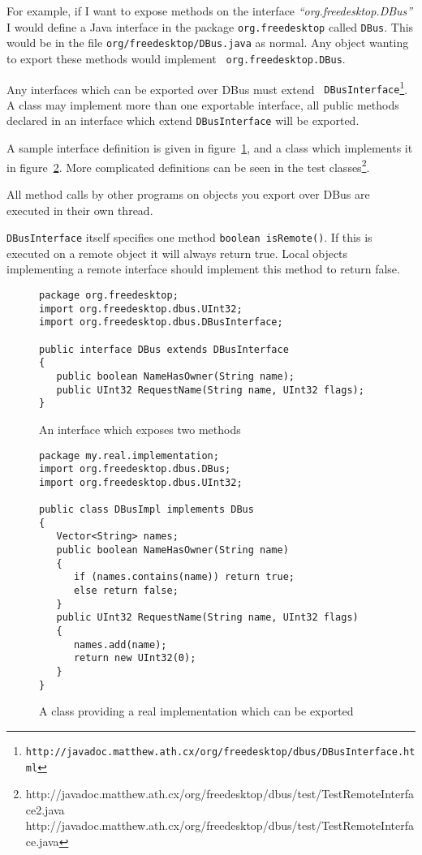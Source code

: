 \documentclass[a4paper,12pt]{article}
\begin{document}
For example, if I want to expose methods on the interface
{\em ``org.freedesktop.DBus''} I would define a Java interface in
the package {\tt org.freedesktop} called {\tt DBus}. This would be
in the file {\tt org/freedesktop/DBus.java} as normal. Any object
wanting to export these methods would implement {\tt
org.freedesktop.DBus}.

Any interfaces which can be exported over DBus must extend {\tt
DBusInterface\footnote{http://javadoc.matthew.ath.cx/org/freedesktop/dbus/DBusInterface.html}}.
A class may implement more than one exportable interface, all public
methods declared in an interface which extend {\tt DBusInterface}
will be exported.

A sample interface definition is given in
figure~\ref{fig:interface}, and a class which implements it in
figure~\ref{fig:class}. More complicated definitions can be seen in
the test
classes\footnote{http://javadoc.matthew.ath.cx/org/freedesktop/dbus/test/TestRemoteInterface2.java
http://javadoc.matthew.ath.cx/org/freedesktop/dbus/test/TestRemoteInterface.java}.

All method calls by other programs on objects you export over DBus
are executed in their own thread.

{\tt DBusInterface} itself specifies one method \verb&boolean isRemote()&. If this is executed on a remote object it will always
return true. Local objects implementing a remote interface should
implement this method to return false.

\begin{figure}[htb]
\begin{center}
\begin{verbatim}
package org.freedesktop;
import org.freedesktop.dbus.UInt32;
import org.freedesktop.dbus.DBusInterface;

public interface DBus extends DBusInterface
{
   public boolean NameHasOwner(String name);
   public UInt32 RequestName(String name, UInt32 flags);
}
\end{verbatim}
\end{center}
\caption{An interface which exposes two methods}
\label{fig:interface}
\end{figure}

\begin{figure}[htb]
\begin{center}
\begin{verbatim}
package my.real.implementation;
import org.freedesktop.dbus.DBus;
import org.freedesktop.dbus.UInt32;

public class DBusImpl implements DBus
{
   Vector<String> names;
   public boolean NameHasOwner(String name)
   {
      if (names.contains(name)) return true;
      else return false;
   }
   public UInt32 RequestName(String name, UInt32 flags)
   {
      names.add(name);
      return new UInt32(0);
   }
}
\end{verbatim}
\end{center}
\caption{A class providing a real implementation which can be exported}
\label{fig:class}
\end{figure}
\end{document}
